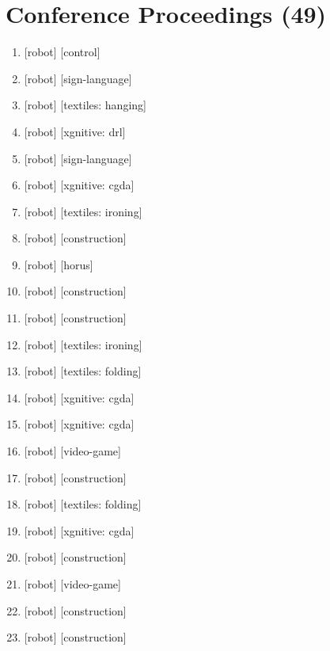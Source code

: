 \documentclass{article}
\begin{document}
\section*{Conference Proceedings (49)}
\begin{enumerate}
  \item {} [robot] [control]
  \item {} [robot] [sign-language]
  \item {} [robot] [textiles: hanging]
  \item {} [robot] [xgnitive: drl]
  \item {} [robot] [sign-language]
  \item {} [robot] [xgnitive: cgda]
  \item {} [robot] [textiles: ironing]
  \item {} [robot] [construction]
  \item {} [robot] [horus]
  \item {} [robot] [construction]
  \item {} [robot] [construction]
  \item {} [robot] [textiles: ironing]
  \item {} [robot] [textiles: folding]
  \item {} [robot] [xgnitive: cgda]
  \item {} [robot] [xgnitive: cgda]
  \item {} [robot] [video-game]
  \item {} [robot] [construction]
  \item {} [robot] [textiles: folding]
  \item {} [robot] [xgnitive: cgda]
  \item {} [robot] [construction]
  \item {} [robot] [video-game]
  \item {} [robot] [construction]
  \item {} [robot] [construction]

\end{enumerate}
\end{document}
